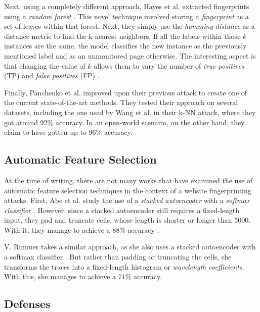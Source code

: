Next, using a completely different approach, Hayes et al. extracted fingerprints using a \textit{random forest} \cite{kfingerprinting}.
This novel technique involved storing a \textit{fingerprint} as a set of leaves within that forest.
Next, they simply use the \textit{hamming distance} as a distance metric to find the k-nearest neighbors.
If all the labels within those $k$ instances are the same, the model classifies the new instance as the previously mentioned label and as an unmonitored page otherwise.
The interesting aspect is that changing the value of $k$ allows them to vary the number of \textit{true positives} (TP) and \textit{false positives} (FP) \cite{kfingerprinting}.

Finally, Panchenko et al. improved upon their previous attack to create one of the current state-of-the-art methods.
They tested their approach on several datasets, including the one used by Wang et al. in their k-NN attack, where they got around 92\% accuracy.
In an open-world scenario, on the other hand, they claim to have gotten up to 96\% accuracy.

\subsection{Automatic Feature Selection}

At the time of writing, there are not many works that have examined the use of automatic feature selection techniques in the context of a website fingerprinting attacks.
First, Abe et al. study the use of a \textit{stacked autoencoder} with a \textit{softmax classifier} \cite{deeplearning}.
However, since a stacked autoencoder still requires a fixed-length input, they pad and truncate cells, whose length is shorter or longer than $5000$.
With it, they manage to achieve a $88\%$ accuracy \cite{deeplearning}.

V. Rimmer takes a similar approach, as she also uses a stacked autoencoder with a softmax classifier \cite{deeplearningthesis}.
But rather than padding or truncating the cells, she transforms the traces into a fixed-length histogram or \textit{wavelength coefficients}.
With this, she manages to achieve a $71\%$ accuracy.

\newpage

\subsection{Defenses} \label{sec:defenses}

